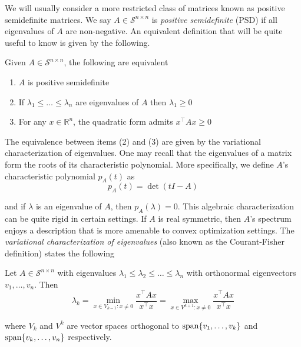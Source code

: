 We will usually consider a more restricted class of matrices known as positive semidefinite matrices. We say $A \in \mathcal{S}^{n \times n}$ is \emph{positive semidefinite} (PSD) if all eigenvalues of $A$ are non-negative. An equivalent definition that will be quite useful to know is given by the following.
\begin{theorem}\label{thm:psd-matrices}
Given $A \in \mathcal{S}^{n \times n}$, the following are equivalent
\vspace{-1em}
\begin{enumerate}
\item $A$ is positive semidefinite

\item If $\lambda_1 \leq \ldots \leq \lambda_n$ are eigenvalues of $A$ then $\lambda_1 \geq 0$

\item For any $x \in \mathbb{R}^n$, the quadratic form admits $x^\top Ax \geq 0$ 
\end{enumerate}
\end{theorem}

The equivalence between items (2) and (3) are given by the variational characterization of eigenvalues. One may recall that the eigenvalues of a matrix form the roots of its characteristic polynomial. More specifically, we define $A$'s characteristic polynomial $p_A(t)$ as
\begin{equation*}
p_A(t) = \det (tI - A)
\end{equation*}

and if $\lambda$ is an eigenvalue of $A$, then $p_A(\lambda) = 0$. This algebraic characterization can be quite rigid in certain settings. If $A$ is real symmetric, then $A$'s spectrum enjoys a description that is more amenable to convex optimization settings. The \emph{variational characterization of eigenvalues} (also known as the Courant-Fisher definition) states the following

\begin{theorem}
Let $A \in \mathcal{S}^{n \times n}$ with eigenvalues $\lambda_1 \leq \lambda_2 \leq \ldots \leq \lambda_n$ with orthonormal eigenvectors $v_1, \ldots, v_n$. Then
\begin{equation*}
\lambda_k 
= \min_{x \in V_{k-1}: x \neq 0} \frac{x^\top Ax}{x^\top x}
= \max_{x \in V^{k+1}: x \neq 0} \frac{x^\top Ax}{x^\top x}
\end{equation*}

where $V_k$ and $V^k$ are vector spaces orthogonal to $\textup{span} \{ v_1, \ldots, v_k \}$ and $\textup{span} \{ v_k, \ldots, v_n \}$ respectively.
\end{theorem}

